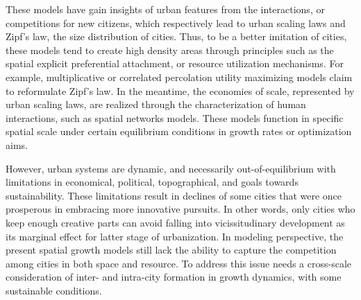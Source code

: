 \documentclass[reprint,unsortedaddress,amsmath,amssymb,aps,prl,showkeys]{revtex4-2}
\begin{document}
These models have gain insights of urban features from the interactions, or competitions for new citizens, which respectively lead to urban scaling laws\cite{bettencourt2007growth,court2013origins,batty2019urbanscalinglaw} and Zipf's law, the size distribution of cities\cite{zipf1949human}. Thus, to be a better imitation of cities, these models tend to create high density areas through principles such as the spatial explicit preferential attachment\cite{schweitzer1998estimation}, or resource utilization mechanisms\cite{PhysRevE.90.042815}. For example, multiplicative or correlated percolation\cite{makse1995modelling,PhysRevE.58.7054,rybski2013distance} utility maximizing\cite{axtell2001emergent} models claim to reformulate Zipf's law.
In the meantime, the economies of scale, represented by urban scaling laws, are realized through the characterization of human interactions\cite{ccolak2016understanding,louf2014congestion,fujita1976spatial}, such as spatial networks models\cite{marsili1998interacting,court2013origins,Li2017Simple}. These models function in specific spatial scale under certain equilibrium conditions in growth rates or optimization aims\cite{zipf1949human}.

However, urban systems are dynamic, and necessarily out-of-equilibrium with limitations in economical, political, topographical, and goals towards sustainability. These limitations result in declines of some cities that were once prosperous in embracing more innovative pursuits\cite{batty2017urban}. In other words, only cities who keep enough creative parts can avoid falling into vicissitudinary
development as its marginal effect for latter
stage of urbanization\cite{atkinson2012urban, girardin2009quantifying,gomez2018explaining,parris2003characterizing,batty2008size}. In modeling perspective, the present spatial growth models still lack the ability to capture the competition among cities in both space and resource. To address this issue needs a cross-scale consideration of inter- and intra-city formation in growth dynamics, with some sustainable conditions.

\end{document}

